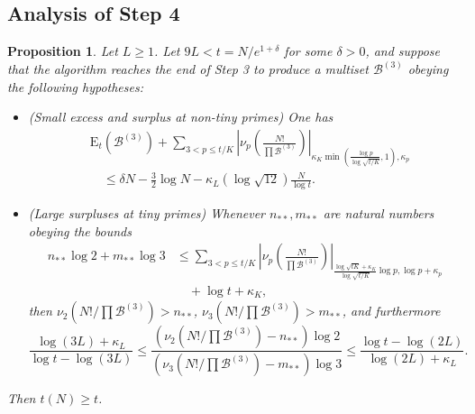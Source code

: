 \documentclass[12pt,a4paper,reqno]{amsart}
\numberwithin{equation}{section}
\theoremstyle{plain}
\newtheorem{proposition}[theorem]{Proposition}
\theoremstyle{definition}
\newcommand\tuple{{\mathcal B}}
\newcommand\excess{{\mathrm{E}}}
\begin{document}
\subsection{Analysis of Step 4}

\begin{proposition}\label{step4-reduce}  Let $L \geq 1$.  Let $9L < t = N/e^{1+\delta}$ for some $\delta>0$, and suppose that the algorithm reaches the end of Step 3 to produce a multiset $\tuple^{(3)}$ obeying the following hypotheses:
  \begin{itemize}
  \item[(i)] (Small excess and surplus at non-tiny primes) One has
\begin{equation}\label{new-balance-5}
    \begin{split}
&      \excess_t(\tuple^{(3)}) + \sum_{3 < p \leq t/K}
   \left|\nu_p\left(\frac{N!}{\prod \tuple^{(3)}}\right)\right|_{\kappa_K \min(\frac{\log p}{\log\sqrt{t/K}},1),\kappa_p}\\
&\quad    \leq \delta N - \frac{3}{2} \log N - \kappa_L (\log \sqrt{12}) \frac{N}{\log t}.
    \end{split}
  \end{equation}
  \item[(ii)] (Large surpluses at tiny primes) 
  Whenever $n_{**}, m_{**}$ are natural numbers obeying the bounds
  \begin{align*}
   n_{**} \log 2 + m_{**} \log 3 &\leq 
    \sum_{3 < p \leq t/K}
    \left|\nu_p\left(\frac{N!}{\prod \tuple^{(3)}}\right)\right|_{\frac{\log \sqrt{tK} + \kappa_K}{\log\sqrt{t/K}} \log p,\log p+\kappa_p}\\
  &\quad  + \log t + \kappa_K,
  \end{align*}
    then $\nu_2(N!/\prod \tuple^{(3)}) > n_{**}$, $\nu_3(N!/\prod \tuple^{(3)}) > m_{**}$, and furthermore
  $$
  \frac{\log(3L)+\kappa_L}{\log t - \log(3L)} \leq \frac{(\nu_2(N!/\prod \tuple^{(3)})-n_{**}) \log 2}{(\nu_3(N!/\prod \tuple^{(3)})-m_{**}) \log 3} \leq \frac{\log t - \log(2L)}{\log(2L)+\kappa_L}.
  $$
  \end{itemize}
     Then $t(N) \geq t$.
\end{proposition}
\end{document}
